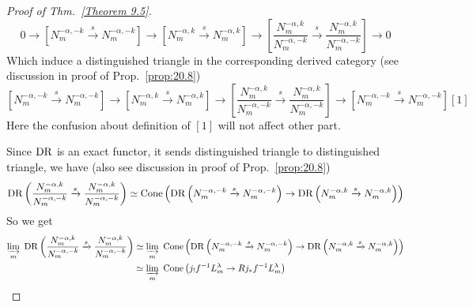 \begin{proof}[Proof of Thm.~\ref{Theorem 9.5}]
    \[
        0 \to \left[ N_m^{-\alpha,-k} \xrightarrow{s} N_m^{-\alpha,-k} \right] \to \left[ N_m^{-\alpha,k} \xrightarrow{s} N_m^{-\alpha,k} \right] \to \left[ \frac{N_m^{-\alpha,k}}{N_m^{-\alpha,-k}} \xrightarrow{s} \frac{N_m^{-\alpha,k}}{N_m^{-\alpha,-k}} \right] \to 0
    \]
    Which induce a distinguished triangle in the corresponding derived category (see discussion in proof of Prop.~\ref{prop:20.8})
    \[
        \left[ N_m^{-\alpha,-k} \xrightarrow{s} N_m^{-\alpha,-k} \right] \to \left[ N_m^{-\alpha,k} \xrightarrow{s} N_m^{-\alpha,k} \right] \to \left[ \frac{N_m^{-\alpha,k}}{N_m^{-\alpha,-k}} \xrightarrow{s} \frac{N_m^{-\alpha,k}}{N_m^{-\alpha,-k}} \right] \to \left[ N_m^{-\alpha,-k} \xrightarrow{s} N_m^{-\alpha,-k} \right][1]
    \]
    Here the confusion about definition of $[1]$ will not affect other part.

    Since $\mathrm{DR}$ is an exact functor, it sends distinguished triangle to distinguished triangle, we have (also see discussion in proof of Prop.~\ref{prop:20.8})
    \[
        \mathrm{DR}\left( \frac{N_m^{-\alpha,k}}{N_m^{-\alpha,-k}} \xrightarrow{s} \frac{N_m^{-\alpha,k}}{N_m^{-\alpha,-k}} \right) \simeq \mathrm{Cone}\left( \mathrm{DR}\left(N_m^{-\alpha,-k} \xrightarrow{s} N_m^{-\alpha,-k}\right) \rightarrow \mathrm{DR}\left(N_m^{-\alpha,k} \xrightarrow{s} N_m^{-\alpha,k}\right)\right)
    \]
    So we get
    \begin{align*}
        \varinjlim_m\  \mathrm{DR}\left( \frac{N_m^{-\alpha,k}}{N_m^{-\alpha,-k}} \xrightarrow{s} \frac{N_m^{-\alpha,k}}{N_m^{-\alpha,-k}} \right) & \simeq \varinjlim_m\  \mathrm{Cone}\left( \mathrm{DR}\left(N_m^{-\alpha,-k} \xrightarrow{s} N_m^{-\alpha,-k}\right) \rightarrow \mathrm{DR}\left(N_m^{-\alpha,k} \xrightarrow{s} N_m^{-\alpha,k}\right)\right) \\
                                                                                                                                                   & \simeq \varinjlim_m\ \mathrm{Cone}\left(j_! f^{-1} L_m^{\lambda} \rightarrow R j_* f^{-1} L_m^{\lambda}\right)
    \end{align*}


\end{proof}
